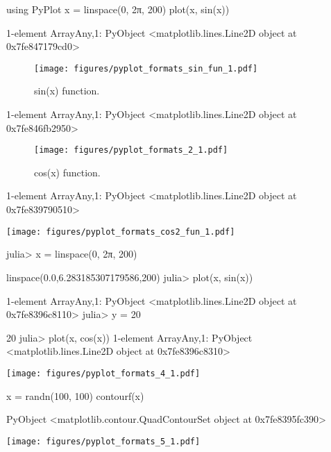



\begin{juliacode}
using PyPlot
x = linspace(0, 2π, 200)
plot(x, sin(x))
\end{juliacode}
\begin{juliaout}
1-element Array{Any,1}:
 PyObject <matplotlib.lines.Line2D object at 0x7fe847179cd0>
\end{juliaout}
\begin{figure}[ht]
\center
\texttt{[image: figures/pyplot\_formats\_sin\_fun\_1.pdf]}
\caption{sin(x) function.}
\label{fig:sin_fun}
\end{figure}



\begin{juliaout}
1-element Array{Any,1}:
 PyObject <matplotlib.lines.Line2D object at 0x7fe846fb2950>
\end{juliaout}
\begin{figure}[htpb]
\center
\texttt{[image: figures/pyplot\_formats\_2\_1.pdf]}
\caption{cos(x) function.}
\end{figure}



\begin{juliaout}
1-element Array{Any,1}:
 PyObject <matplotlib.lines.Line2D object at 0x7fe839790510>
\end{juliaout}
\texttt{[image: figures/pyplot\_formats\_cos2\_fun\_1.pdf]}



\begin{juliaterm}
julia> x = linspace(0, 2π, 200)

linspace(0.0,6.283185307179586,200)
julia> plot(x, sin(x))

1-element Array{Any,1}:
 PyObject <matplotlib.lines.Line2D object at 0x7fe8396c8110>
julia> y = 20

20
julia> plot(x, cos(x))
1-element Array{Any,1}:
 PyObject <matplotlib.lines.Line2D object at 0x7fe8396c8310>
\end{juliaterm}
\texttt{[image: figures/pyplot\_formats\_4\_1.pdf]}



\begin{juliacode}
x = randn(100, 100)
contourf(x)
\end{juliacode}
\begin{juliaout}
PyObject <matplotlib.contour.QuadContourSet object at 0x7fe8395fc390>
\end{juliaout}
\texttt{[image: figures/pyplot\_formats\_5\_1.pdf]}
